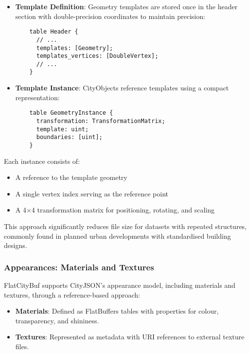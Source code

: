 \begin{itemize}
    \item \textbf{Template Definition}: Geometry templates are stored once in the header section with double-precision coordinates to maintain precision:

    \begin{verbatim}
    table Header {
      // ...
      templates: [Geometry];
      templates_vertices: [DoubleVertex];
      // ...
    }
    \end{verbatim}

    \item \textbf{Template Instance}: CityObjects reference templates using a compact representation:

    \begin{verbatim}
    table GeometryInstance {
      transformation: TransformationMatrix;
      template: uint;
      boundaries: [uint];
    }
    \end{verbatim}
\end{itemize}

Each instance consists of:
\begin{itemize}
    \item A reference to the template geometry
    \item A single vertex index serving as the reference point
    \item A 4×4 transformation matrix for positioning, rotating, and scaling
\end{itemize}

This approach significantly reduces file size for datasets with repeated structures, commonly found in planned urban developments with standardised building designs.

\subsubsection{Appearances: Materials and Textures}
\label{subsubsec:appearances}

FlatCityBuf supports CityJSON's appearance model, including materials and textures, through a reference-based approach:

\begin{itemize}
    \item \textbf{Materials}: Defined as FlatBuffers tables with properties for colour, transparency, and shininess.
    \item \textbf{Textures}: Represented as metadata with URI references to external texture files.
\end{itemize}

